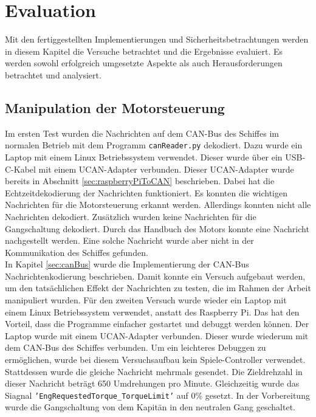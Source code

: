 \chapter{Evaluation}

Mit den fertiggestellten Implementierungen und Sicherheitsbetrachtungen werden in diesem Kapitel die
Versuche betrachtet und die Ergebnisse evaluiert. Es werden sowohl erfolgreich umgesetzte Aspekte als auch
Herausforderungen betrachtet und analysiert.

\section{Manipulation der Motorsteuerung}

Im ersten Test wurden die Nachrichten auf dem CAN-Bus des Schiffes im normalen Betrieb mit dem Programm \texttt{canReader.py} 
dekodiert. Dazu wurde ein Laptop mit einem Linux Betriebssystem verwendet. Dieser wurde über ein USB-C-Kabel mit einem 
UCAN-Adapter verbunden. Dieser UCAN-Adapter wurde bereits in Abschnitt \ref{sec:raspberryPiToCAN} beschrieben. 
Dabei hat die Echtzeitdekodierung der Nachrichten funktioniert. Es konnten die wichtigen Nachrichten für die Motorsteuerung
erkannt werden. Allerdings konnten nicht alle Nachrichten dekodiert. Zusätzlich wurden keine Nachrichten für die Gangschaltung
dekodiert. Durch das Handbuch
des Motors konnte eine Nachricht nachgestellt werden. Eine solche Nachricht wurde aber nicht in der Kommunikation des 
Schiffes gefunden. \\
In Kapitel \ref{sec:canBus} wurde die Implementierung der CAN-Bus Nachrichtenkodierung beschrieben. 
Damit konnte ein Versuch
aufgebaut werden, um den tatsächlichen Effekt der Nachrichten zu testen, die im Rahmen der Arbeit manipuliert wurden. 
Für den zweiten Versuch wurde wieder ein Laptop mit einem Linux Betriebssystem verwendet, anstatt des Raspberry Pi. 
Das hat den Vorteil, dass
die Programme einfacher gestartet und debuggt werden können. Der Laptop wurde mit einem UCAN-Adapter verbunden.  
Dieser wurde wiederum mit dem CAN-Bus des Schiffes verbunden. Um ein leichteres Debuggen zu ermöglichen, wurde bei diesem 
Versuchsaufbau kein Spiele-Controller verwendet. Stattdessen wurde die gleiche Nachricht mehrmals gesendet. Die Zieldrehzahl in 
dieser Nachricht beträgt 650 Umdrehungen pro Minute. Gleichzeitig wurde das Siagnal \texttt{'EngRequestedTorque\_TorqueLimit'} 
auf 0\% gesetzt. In der Vorbereitung wurde die Gangschaltung von dem Kapitän in den neutralen
Gang geschaltet. \\
